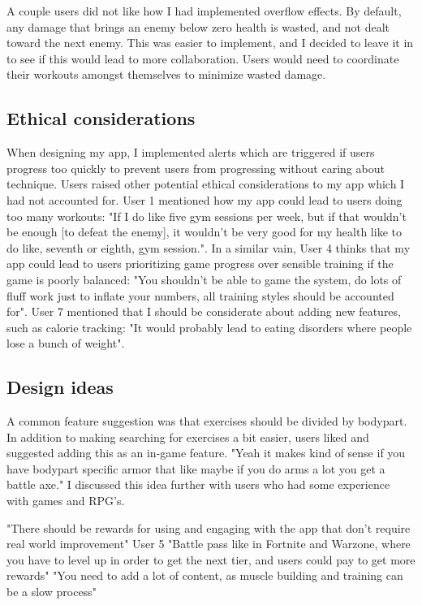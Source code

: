 \documentclass{l4proj}
\begin{document}
A couple users did not like how I had implemented overflow effects. By default, any damage that brings an enemy below zero health is wasted, and not dealt toward the next enemy. This was easier to implement, and I decided to leave it in to see if this would lead to more collaboration. Users would need to coordinate their workouts amongst themselves to minimize wasted damage.

\subsection{Ethical considerations}
When designing my app, I implemented alerts which are triggered if users progress too quickly to prevent users from progressing without caring about technique. Users raised other potential ethical considerations to my app which I had not accounted for. User 1 mentioned how my app could lead to users doing too many workouts: "If I do like five gym sessions per week, but if that wouldn't be enough [to defeat the enemy], it wouldn't be very good for my health like to do like, seventh or eighth, gym session.". In a similar vain, User 4 thinks that my app could lead to users prioritizing game progress over sensible training if the game is poorly balanced: "You shouldn't be able to game the system, do lots of fluff work just to inflate your numbers, all training styles should be accounted for". User 7 mentioned that I should be considerate about adding new features, such as calorie tracking: "It would probably lead to eating disorders where people lose a bunch of weight".

\subsection{Design ideas}
A common feature suggestion was that exercises should be divided by bodypart. In addition to making searching for exercises a bit easier, users liked and suggested adding this as an in-game feature. "Yeah it makes kind of sense if you have bodypart specific armor that like maybe if you do arms a lot you get a battle axe." I discussed this idea further with users who had some experience with games and RPG's. 

"There should be rewards for using and engaging with the app that don't require real world improvement"
User 5
 "Battle pass like in Fortnite and Warzone, where you have to level up in order to get the next tier, and users could pay to get more rewards"
  "You need to add a lot of content, as muscle building and training can be a slow process"
\end{document}
